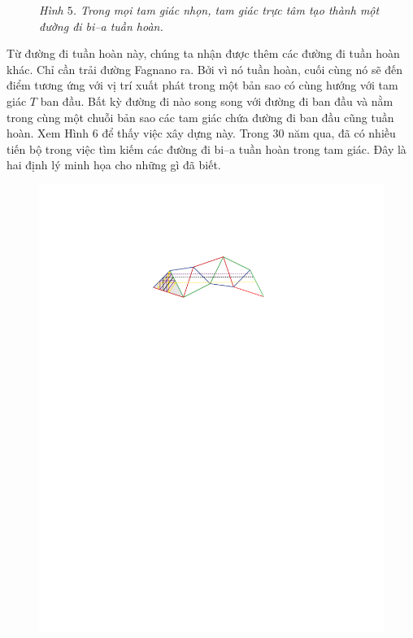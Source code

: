 \begin{multicols}{2}
\begin{figure}[H]
		\caption{\small\textit{\color{duongvaotoanhoc}Hình $5$. Trong mọi tam giác nhọn, tam giác trực tâm tạo thành một đường đi bi--a tuần hoàn.}}
		\vspace*{-10pt}
	\end{figure}
	Từ đường đi tuần hoàn này, chúng ta nhận được thêm các đường đi tuần hoàn khác. Chỉ cần trải đường Fagnano ra. Bởi vì nó tuần hoàn, cuối cùng nó sẽ đến điểm tương ứng với vị trí xuất phát trong một bản sao có cùng hướng với tam giác $T$ ban đầu. Bất kỳ đường đi nào song song với đường đi ban đầu và nằm trong cùng một chuỗi  
	bản sao các tam giác chứa đường đi ban đầu cũng tuần hoàn. Xem Hình $6$ để thấy việc xây dựng này.
	\vskip 0.1cm
	Trong $30$ năm qua, đã có nhiều tiến bộ trong việc tìm kiếm các đường đi bi--a tuần hoàn trong tam giác. Đây là hai định lý minh họa cho những gì đã biết.
	\begin{figure}[H]
		\vspace*{-5pt}
		\centering
		\captionsetup{labelformat= empty, justification=centering}
		\includegraphics[width= 1\linewidth]{6}

\end{figure}
\end{multicols}
